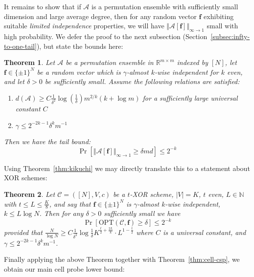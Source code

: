 \documentclass[11pt]{article}
\newtheorem{theorem}{Theorem}
\newcommand{\norm}[1]{\Vert #1 \Vert}
\newcommand{\Opt}{\mathrm{OPT}}
\newcommand{\N}{[N]}
\begin{document}
It remains to show that if $\mathcal{A}$ is a permutation ensemble with sufficiently small dimension and large average degree, then for any random vector $\bm{f}$ exhibiting suitable \emph{limited independence} properties, we will have $\norm{\mathcal{A}[\bm{f}]}_{\infty \to 1}$ small with high probability. We defer the proof to the next subsection (Section~\ref{subsec:infty-to-one-tail}), but state the bounds here:
\begin{theorem}\label{thm:infty-one-tail-bound}
Let $\mathcal{A}$ be a permutation ensemble in $\mathbb{R}^{m \times m}$ indexed by $\N$, let $\bm{f} \in \{\pm 1\}^N$ be a random vector which is $\gamma$-almost $k$-wise independent for $k$ even, and let $\delta > 0$ be sufficiently small. Assume the following relations are satisfied:
\begin{enumerate}
	\item $d(\mathcal{A})\geq   C\frac{1}{\delta^2} \log(\frac{1}{\delta}) m^{2/k}(k+\log m )$ for a sufficiently large universal constant $C$
	\item $\gamma \leq 2^{-2k-1}\delta^km^{-1}$ 
\end{enumerate}
Then we have the tail bound:
\[
\Pr[\norm{\mathcal{A}[\bm{f}]}_{\infty \to 1} \geq \delta m d] \leq 2^{-k}
\]
\end{theorem}
Using Theorem~\ref{thm:kikuchi} we may directly translate this to a statement about XOR schemes: 
\begin{theorem}\label{thm:k-wise-csp}
Let $\mathcal{C} = ([N],V,c)$ be a $t$-XOR scheme, $|V|=K$, $t$ even, $L \in \mathbb{N}$ with $t \leq L \leq \frac{K}{8}$, and say that $\bm{f}\in \{\pm 1\}^N$ is $\gamma$-almost $k$-wise independent, $k \leq L \log N$. Then for any $\delta >0$ sufficiently small we have
\[
\Pr[\Opt(\mathcal{C},\bm{f}) \geq \delta ] \leq 2^{-k}
\]
provided that $\frac{N}{\log N} \geq C \frac{1}{\delta^2} \log \frac{1}{\delta} K^{\frac{t}{2} + \frac{2L}{k}}\cdot  L^{1 - \frac{t}{2}}$ where $C$ is a universal constant, and $\gamma \leq 2^{-2k - 1} \delta^k m^{-1}$.
\end{theorem}

Finally applying the above Theorem together with Theorem~\ref{thm:cell-csp}, we obtain our main cell probe lower bound:
\end{document}
